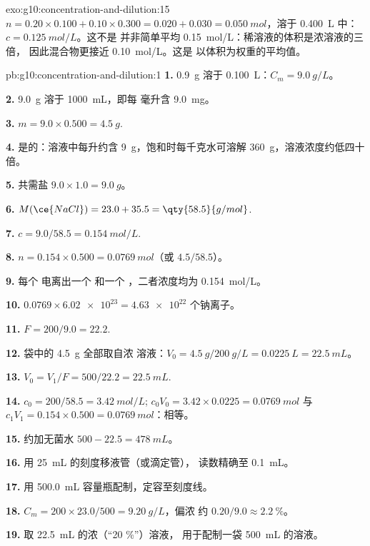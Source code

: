 \begin{solution}{exo:g10:concentration-and-dilution:15}
$n = 0.20 \times 0.100 + 0.10 \times 0.300 = 0.020 + 0.030 =
\qty{0.050}{mol}$，溶于 \qty{0.400}{L} 中：$c = \qty{0.125}{mol/L}$。这不是
并非简单平均 \qty{0.15}{mol/L}：稀溶液的体积是浓溶液的三倍，
因此混合物更接近 \qty{0.10}{mol/L}。这是
以体积为权重的平均值。
\end{solution}

\begin{solution}{pb:g10:concentration-and-dilution:1}
\textbf{1.} \qty{0.9}{g} 溶于 \qty{0.100}{L}：$C_m = \qty{9.0}{g/L}$。

\textbf{2.} \qty{9.0}{g} 溶于 \qty{1000}{mL}，即每
毫升含 \qty{9.0}{mg}。

\textbf{3.} $m = 9.0 \times 0.500 = \qty{4.5}{g}$.

\textbf{4.} 是的：溶液中每升约含 \qty{9}{g}，饱和时每千克水可溶解
\qty{360}{g}，溶液浓度约低四十倍。

\textbf{5.} 共需盐 $9.0 \times 1.0 = \qty{9.0}{g}$。

\textbf{6.} $M(\ce{NaCl}) = 23.0 + 35.5 = \qty{58.5}{g/mol}$.

\textbf{7.} $c = 9.0 / 58.5 = \qty{0.154}{mol/L}$.

\textbf{8.} $n = 0.154 \times 0.500 = \qty{0.0769}{mol}$（或
$4.5 / 58.5$）。

\textbf{9.} 每个  电离出一个  和一个 ，二者浓度均为
\qty{0.154}{mol/L}。

\textbf{10.} $0.0769 \times \num{6.02e23} = \num{4.63e22}$ 个钠离子。

\textbf{11.} $F = 200 / 9.0 = 22.2$.

\textbf{12.} 袋中的 \qty{4.5}{g} 全部取自浓
溶液：$V_0 = \qty{4.5}{g} / \qty{200}{g/L} = \qty{0.0225}{L} =
\qty{22.5}{mL}$。

\textbf{13.} $V_0 = V_1 / F = 500 / 22.2 = \qty{22.5}{mL}$.

\textbf{14.} $c_0 = 200 / 58.5 = \qty{3.42}{mol/L}$;
$c_0 V_0 = 3.42 \times 0.0225 = \qty{0.0769}{mol}$ 与
$c_1 V_1 = 0.154 \times 0.500 = \qty{0.0769}{mol}$：相等。

\textbf{15.} 约加无菌水 $500 - 22.5 = \qty{478}{mL}$。

\textbf{16.} 用 \qty{25}{mL} 的刻度移液管（或滴定管），
读数精确至 \qty{0.1}{mL}。

\textbf{17.} 用 \qty{500.0}{mL} 容量瓶配制，定容至刻度线。

\textbf{18.} $C_m = 200 \times 23.0 / 500 = \qty{9.20}{g/L}$，偏浓
约 $0.20 / 9.0 \approx \qty{2.2}{\percent}$。

\textbf{19.} 取 \qty{22.5}{mL} 的浓（“20 \%”）溶液，
用于配制一袋 \qty{500}{mL} 的溶液。
\end{solution}
